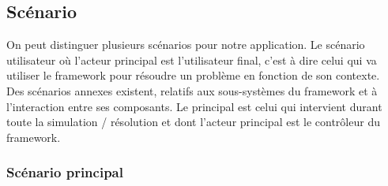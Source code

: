 %
\subsection{Scénario}

On peut distinguer plusieurs scénarios pour notre application. Le scénario utilisateur où l'acteur principal est l'utilisateur final, c'est à dire celui qui va utiliser le framework pour résoudre un problème en fonction de son contexte.\\

Des scénarios annexes existent, relatifs aux sous-systèmes du framework et à l’interaction entre ses composants. Le principal est celui qui intervient durant toute la simulation / résolution et dont l'acteur principal est le contrôleur du framework.

%
\subsubsection{Scénario principal}

